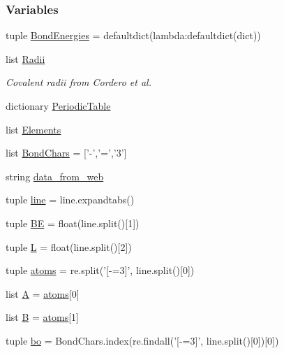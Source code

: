 \subsubsection*{Variables}
\begin{DoxyCompactItemize}
\item 
tuple \hyperlink{namespaceforcebalance_1_1chemistry_aa5baf093f9cb069966eae63492327221}{Bond\-Energies} = defaultdict(lambda\-:defaultdict(dict))
\item 
list \hyperlink{namespaceforcebalance_1_1chemistry_a5b56f8045a8e79c5b088a58695fa460f}{Radii}
\begin{DoxyCompactList}\small\item\em Covalent radii from Cordero et al. \end{DoxyCompactList}\item 
dictionary \hyperlink{namespaceforcebalance_1_1chemistry_a3b40e0b86fc49653419be09202f42ef1}{Periodic\-Table}
\item 
list \hyperlink{namespaceforcebalance_1_1chemistry_a52ebc743ef6b24dbe00504b72490996c}{Elements}
\item 
list \hyperlink{namespaceforcebalance_1_1chemistry_ac5fcb01c4de1456a654dd920150069f3}{Bond\-Chars} = \mbox{[}'-\/','=','3'\mbox{]}
\item 
string \hyperlink{namespaceforcebalance_1_1chemistry_a4080110f15046bfd2f27bbb60ba2ef66}{data\-\_\-from\-\_\-web}
\item 
tuple \hyperlink{namespaceforcebalance_1_1chemistry_a5a3b715a402d39a5da6ae558e400ce85}{line} = line.\-expandtabs()
\item 
tuple \hyperlink{namespaceforcebalance_1_1chemistry_a147524ef7449edeb6a5996f861f00d7c}{B\-E} = float(line.\-split()\mbox{[}1\mbox{]})
\item 
tuple \hyperlink{namespaceforcebalance_1_1chemistry_ad5838ecc45d68a3a29f0c2518ceaaca2}{L} = float(line.\-split()\mbox{[}2\mbox{]})
\item 
tuple \hyperlink{namespaceforcebalance_1_1chemistry_ab17d5407c5d506aba3077ed57ffd9b97}{atoms} = re.\-split('\mbox{[}-\/=3\mbox{]}', line.\-split()\mbox{[}0\mbox{]})
\item 
list \hyperlink{namespaceforcebalance_1_1chemistry_a352fe220850f433a698a751ed1210881}{A} = \hyperlink{namespaceforcebalance_1_1chemistry_ab17d5407c5d506aba3077ed57ffd9b97}{atoms}\mbox{[}0\mbox{]}
\item 
list \hyperlink{namespaceforcebalance_1_1chemistry_a67544d273d0599a13b4c6ad98302ed21}{B} = \hyperlink{namespaceforcebalance_1_1chemistry_ab17d5407c5d506aba3077ed57ffd9b97}{atoms}\mbox{[}1\mbox{]}
\item 
tuple \hyperlink{namespaceforcebalance_1_1chemistry_a69da1f7f7b3940c14cc2b61e2bc64dd0}{bo} = Bond\-Chars.\-index(re.\-findall('\mbox{[}-\/=3\mbox{]}', line.\-split()\mbox{[}0\mbox{]})\mbox{[}0\mbox{]})
\end{DoxyCompactItemize}


